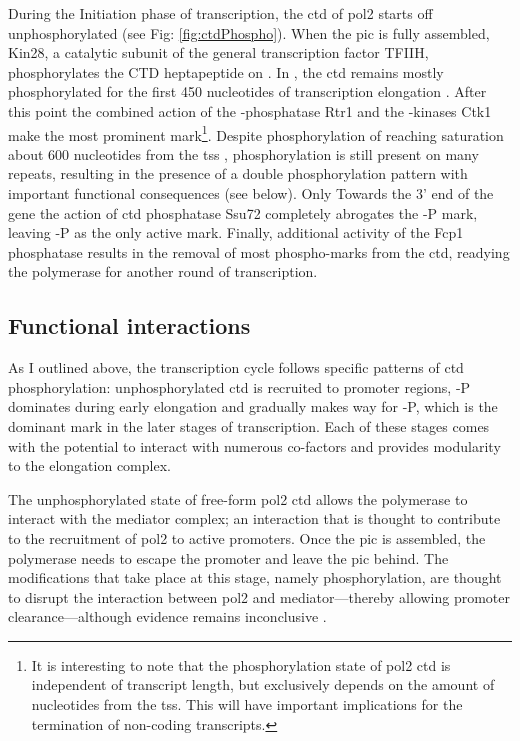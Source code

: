 During the Initiation phase of transcription, the \gls{ctd} of \gls{pol2} starts off unphosphorylated (see Fig: \ref{fig:ctdPhospho}).
When the \gls{pic} is fully assembled, Kin28, a catalytic subunit of the general transcription factor TFIIH, phosphorylates the CTD heptapeptide on \serf{}.
In \cer{}, the \gls{ctd} remains mostly \serf{} phosphorylated for the first 450 nucleotides of transcription elongation \citep{mayer:2010:uniform}. 
After this point the combined action of the \serf{}-phosphatase Rtr1 \citep{mosley:2009:rtr1, hunter:2016:phosphatase} and the \sert{}-kinases Ctk1 \citep{qiu:2009:phosphorylation} make \sert{} the most prominent mark\footnote{
It is interesting to note that the phosphorylation state of \gls{pol2} \gls{ctd} is independent of transcript length, but exclusively depends on the amount of nucleotides from the \gls{tss}. 
This will have important implications for the termination of non-coding transcripts.}.
Despite phosphorylation of \sert{} reaching saturation about 600 nucleotides from the \gls{tss} \citep{mayer:2010:uniform}, \serf{} phosphorylation is still present on many repeats, resulting in the presence of a double phosphorylation pattern with important functional consequences (see below).
Only Towards the 3' end of the gene the action of \gls{ctd} phosphatase Ssu72 completely abrogates the \serf{}-P mark, leaving \sert{}-P as the only active mark.
Finally, additional activity of the Fcp1 phosphatase results in the removal of most phospho-marks from the \gls{ctd}, readying the polymerase for another round of transcription.

\subsection{Functional interactions}

As I outlined above, the transcription cycle follows specific patterns of \gls{ctd} phosphorylation: unphosphorylated \gls{ctd} is recruited to promoter regions, \serf{}-P dominates during early elongation and gradually makes way for \sert{}-P, which is the dominant mark in the later stages of transcription. Each of these stages comes with the potential to interact with numerous co-factors and provides modularity to the elongation complex.

The unphosphorylated state of free-form \gls{pol2} \gls{ctd} allows the polymerase to interact with the mediator complex; an interaction that is thought to contribute to the recruitment of \gls{pol2} to active promoters. 
Once the \gls{pic} is assembled, the polymerase needs to escape the promoter and leave the \acrlong{pic} behind.
The modifications that take place at this stage, namely \serf{} phosphorylation, are thought to disrupt the interaction between \gls{pol2} and mediator---thereby allowing promoter clearance---although evidence remains inconclusive \citep{so:2007:hyperphosphorylation, davis:2002:structure}.

